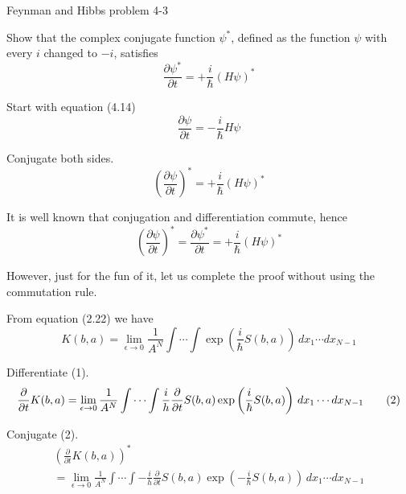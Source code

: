 \documentclass[12pt]{article}
\begin{document}
\begin{center}
Feynman and Hibbs problem 4-3
\end{center}

Show that the complex conjugate function $\psi^*$,
defined as the function $\psi$ with every $i$ changed to $-i$,
satisfies
\begin{equation*}
\frac{\partial\psi^*}{\partial t}=+\frac{i}{\hbar}(H\psi)^*
\end{equation*}

Start with equation (4.14)
\begin{equation*}
\frac{\partial\psi}{\partial t}=-\frac{i}{\hbar}H\psi
\end{equation*}

Conjugate both sides.
\begin{equation*}
\left(\frac{\partial\psi}{\partial t}\right)^*=+\frac{i}{\hbar}(H\psi)^*
\end{equation*}

It is well known that conjugation and differentiation commute, hence
\begin{equation*}
\left(\frac{\partial\psi}{\partial t}\right)^*=\frac{\partial\psi^*}{\partial t}=+\frac{i}{\hbar}(H\psi)^*
\end{equation*}

However, just for the fun of it, let us complete the proof without using the commutation rule.

\bigskip
From equation (2.22) we have
\begin{equation*}
K(b,a)=\lim_{\epsilon\rightarrow0}\frac{1}{A^N}\int\cdots\int
\exp\left(\frac{i}{\hbar}S(b,a)\right)\,dx_1\cdots dx_{N-1}
\tag{1}
\end{equation*}

Differentiate (1).
\begin{equation*}
\frac{\partial}{\partial t}K(b,a)
\\
=
\lim_{\epsilon\rightarrow0}\frac{1}{A^N}
\int\cdots\int
\frac{i}{h}\frac{\partial}{\partial t}S(b,a)
\exp\left(\frac{i}{\hbar}S(b,a)\right)\,dx_1\cdots dx_{N-1}
\tag{2}
\end{equation*}

Conjugate (2).
\begin{multline*}
\left(\frac{\partial}{\partial t}K(b,a)\right)^*
\\
=\lim_{\epsilon\rightarrow0}\frac{1}{A^N}
\int\cdots\int
-\frac{i}{h}\frac{\partial}{\partial t}S(b,a)
\exp\left(-\frac{i}{\hbar}S(b,a)\right)\,dx_1\cdots dx_{N-1}
\end{multline*}
\end{document}
